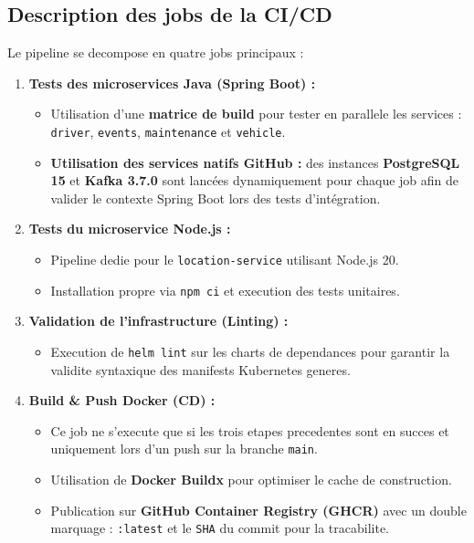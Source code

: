 \documentclass[12pt,a4paper]{article}
\begin{document}
\subsection{Description des jobs de la CI/CD}
                       
Le pipeline se decompose en quatre jobs principaux :

\begin{enumerate}[leftmargin=*, label=\textbf{\arabic*.}]
  \item \textbf{Tests des microservices Java (Spring Boot) :}
        \begin{itemize}
          \item Utilisation d'une \textbf{matrice de build} pour tester en parallele les services : \texttt{driver}, \texttt{events}, \texttt{maintenance} et \texttt{vehicle}.
\item \textbf{Utilisation des services natifs GitHub :} des instances \textbf{PostgreSQL 15} et \textbf{Kafka 3.7.0} sont lancées dynamiquement pour chaque job afin de valider le contexte Spring Boot lors des tests d'intégration.
        \end{itemize}

  \item \textbf{Tests du microservice Node.js :}
        \begin{itemize}
          \item Pipeline dedie pour le \texttt{location-service} utilisant Node.js 20.
          \item Installation propre via \texttt{npm ci} et execution des tests unitaires.
        \end{itemize}

  \item \textbf{Validation de l'infrastructure (Linting) :}
        \begin{itemize}
          \item Execution de \texttt{helm lint} sur les charts de dependances pour garantir la validite syntaxique des manifests Kubernetes generes.
        \end{itemize}

  \item \textbf{Build \& Push Docker (CD) :}
        \begin{itemize}
          \item Ce job ne s'execute que si les trois etapes precedentes sont en succes et uniquement lors d'un push sur la branche \texttt{main}.
          \item Utilisation de \textbf{Docker Buildx} pour optimiser le cache de construction.
          \item Publication sur \textbf{GitHub Container Registry (GHCR)} avec un double marquage : \texttt{:latest} et le \texttt{SHA} du commit pour la tracabilite.
        \end{itemize}
\end{enumerate}
\end{document}
